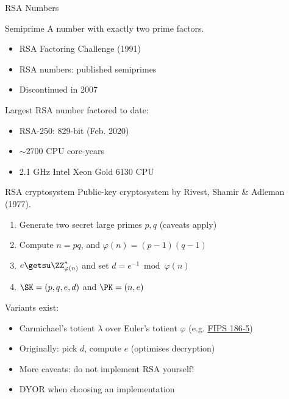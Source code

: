 \begin{frame}{RSA Numbers}
  \pause
  \begin{block}{Semiprime}
    A number with exactly two prime factors.
  \end{block}
  
  \begin{itemize}[<+(1)->]
    \item RSA Factoring Challenge (1991)
    \item RSA numbers: published semiprimes
    \item Discontinued in 2007
  \end{itemize}

  \pause
  Largest RSA number factored to date:
  \begin{itemize}[<+(1)->]
    \item RSA-250: 829-bit (Feb. 2020)
    \item $\sim$2700 CPU core-years
    \item 2.1 GHz Intel Xeon Gold 6130 CPU
  \end{itemize}
\end{frame}

\begin{frame}{RSA cryptosystem}
  Public-key cryptosystem by Rivest, Shamir \& Adleman (1977).
  
  \begin{enumerate}[<+(1)->]
    \item Generate two secret large primes $p,q$ (caveats apply)
    \item Compute $n=pq$, and $\varphi(n)=(p-1)(q-1)$
    \item $e \getsu \ZZ_{\varphi(n)}^*$ and set $d = e^{-1} \bmod \varphi(n)$
    \item $\SK=(p,q,e,d)$ and $\PK = (n,e)$
  \end{enumerate}

  \pause
  Variants exist:
  \begin{itemize}[<+(1)->]
    \item Carmichael's totient $\lambda$ over Euler's totient $\varphi$ (e.g. \href{https://csrc.nist.gov/pubs/fips/186-5/final}{FIPS 186-5})
    \item Originally: pick $d$, compute $e$ (optimises decryption)
    \item More caveats: do not implement RSA yourself!
    \item DYOR when choosing an implementation
  \end{itemize}
\end{frame}

